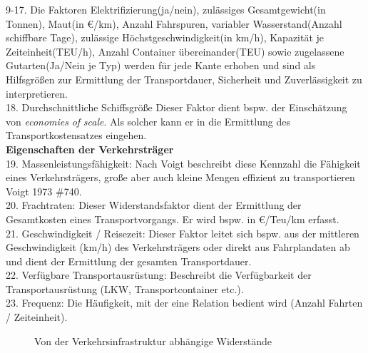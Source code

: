 9-17. Die Faktoren \glqq Elektrifizierung\grqq  (ja/nein), \glqq zulässiges Gesamtgewicht\grqq  (in Tonnen), \glqq Maut\grqq  (in \euro /km), \glqq Anzahl Fahrspuren\grqq , \glqq variabler Wasserstand\grqq  (Anzahl schiffbare Tage), \glqq zulässige Höchstgeschwindigkeit\grqq  (in km/h), \glqq Kapazität je Zeiteinheit\grqq  (TEU/h), \glqq Anzahl Container übereinander\grqq  (TEU) sowie \glqq zugelassene Gutarten\grqq  (Ja/Nein je Typ) werden für jede Kante erhoben und sind als Hilfsgrößen zur Ermittlung der Transportdauer, Sicherheit und Zuverlässigkeit zu interpretieren. ~\\
18. Durchschnittliche Schiffsgröße  Dieser Faktor dient bspw. der Einschätzung von \emph{economies}\emph{ }\emph{of}\emph{ }\emph{scale}. Als solcher kann er in die Ermittlung des Transportkostensatzes eingehen.~\\
\textbf{Eigenschaften der Verkehrsträger}~\\
19. Massenleistungsfähigkeit: Nach Voigt beschreibt diese Kennzahl die Fähigkeit eines Verkehrsträgers, große aber auch kleine Mengen effizient zu transportieren {Voigt 1973 \#740}.~\\
20. Frachtraten: Dieser Widerstandsfaktor dient der Ermittlung der Gesamtkosten eines Transportvorgangs. Er wird bspw. in \euro /Teu/km erfasst.~\\
21. Geschwindigkeit / Reisezeit: Dieser Faktor leitet sich bspw. aus der mittleren Geschwindigkeit (km/h) des Verkehrsträgers oder direkt aus Fahrplandaten ab und dient der Ermittlung der gesamten Transportdauer.~\\
22. Verfügbare Transportausrüstung: Beschreibt die Verfügbarkeit der Transportausrüstung (LKW, Transportcontainer etc.).~\\
23. Frequenz: Die Häufigkeit, mit der eine Relation bedient wird (Anzahl Fahrten / Zeiteinheit).~\\

\begin{figure}[htbp]
  \centering
  \caption{ Von der Verkehrsinfrastruktur abhängige Widerstände}
  \label{_Ref333934750}
\end{figure}
~\\
~\\


% 
